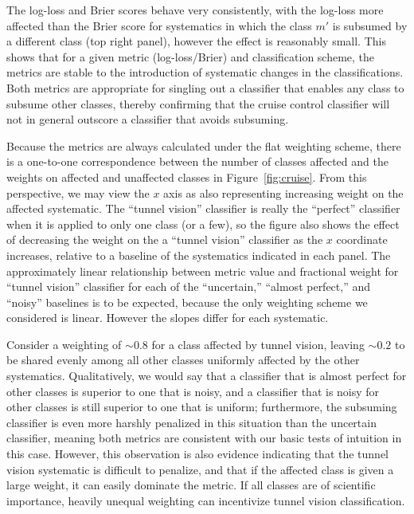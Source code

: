 The log-loss and Brier scores behave very consistently, with the log-loss more affected than the Brier score for systematics in which the class $m'$ is subsumed by a different class (top right panel), however the effect is reasonably small.
This shows that for a given metric (log-loss/Brier) and classification scheme, the metrics are stable to the introduction of systematic changes in the classifications.
Both metrics are appropriate for singling out a classifier that enables any class to subsume other classes, thereby confirming that the cruise control classifier will not in general outscore a classifier that avoids subsuming.

Because the metrics are always calculated under the flat weighting scheme, there is a one-to-one correspondence between the number of classes affected and the weights on affected and unaffected classes in Figure~\ref{fig:cruise}.
From this perspective, we may view the $x$ axis as also representing increasing weight on the affected systematic.
The ``tunnel vision'' classifier is really the ``perfect'' classifier when it is applied to only one class (or a few), so the figure also shows the effect of decreasing the weight on the a ``tunnel vision'' classifier as the $x$ coordinate increases, relative to a baseline of the systematics indicated in each panel.
The approximately linear relationship between metric value and fractional weight for ``tunnel vision'' classifier for each of the ``uncertain,'' ``almost perfect,'' and ``noisy'' baselines is to be expected, because the only weighting scheme we considered is linear.
However the slopes differ for each systematic.

Consider a weighting of $\sim0.8$ for a class affected by tunnel vision, leaving $\sim0.2$ to be shared evenly among all other classes uniformly affected by the other systematics.
Qualitatively, we would say that a classifier that is almost perfect for other classes is superior to one that is noisy, and a classifier that is noisy for other classes is still superior to one that is uniform; furthermore, the subsuming classifier is even more harshly penalized in this situation than the uncertain classifier, meaning both metrics are  consistent with our basic tests of intuition in this case.
However, this observation is also evidence indicating that the tunnel vision systematic is difficult to penalize, and that if the affected class is given a large weight, it can easily dominate the metric.
If all classes are of scientific importance, heavily unequal weighting can incentivize tunnel vision classification.

